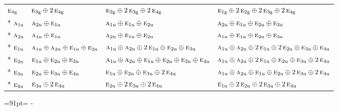 \documentclass[10pt,a4paper]{article}
\newcommand{\needspace}[1]{\par\penalty-100\begingroup\dimen0=#1\relax\dimen2=\pagegoal
  \advance\dimen2-\pagetotal\ifdim\dimen0>\dimen2\relax\ifdim\dimen2>0pt\vfil\break\fi\fi
  \endgroup}
\numberwithin{equation}{section}
\newcommand{\irr}[1]{\text{\normalfont\scshape #1}}
\newcommand{\ptag}[1]{\mathrm{#1}}
\begin{document}
{\begin{longtable}{@{}llll@{}}
$\irr{e}_{4\ptag{g}}$ & $\irr{e}_{3\ptag{g}}\oplus 2\,\irr{e}_{4\ptag{g}}$ & $\irr{e}_{2\ptag{g}}\oplus 2\,\irr{e}_{3\ptag{g}}\oplus 2\,\irr{e}_{4\ptag{g}}$ & $\irr{e}_{1\ptag{g}}\oplus 2\,\irr{e}_{2\ptag{g}}\oplus 2\,\irr{e}_{3\ptag{g}}\oplus 2\,\irr{e}_{4\ptag{g}}$\\*
$\irr{a}_{1\ptag{u}}$ & $\irr{a}_{2\ptag{u}}\oplus \irr{e}_{1\ptag{u}}$ & $\irr{a}_{1\ptag{u}}\oplus \irr{e}_{1\ptag{u}}\oplus \irr{e}_{2\ptag{u}}$ & $\irr{a}_{2\ptag{u}}\oplus \irr{e}_{1\ptag{u}}\oplus \irr{e}_{2\ptag{u}}\oplus \irr{e}_{3\ptag{u}}$\\*
$\irr{a}_{2\ptag{u}}$ & $\irr{a}_{1\ptag{u}}\oplus \irr{e}_{1\ptag{u}}$ & $\irr{a}_{2\ptag{u}}\oplus \irr{e}_{1\ptag{u}}\oplus \irr{e}_{2\ptag{u}}$ & $\irr{a}_{1\ptag{u}}\oplus \irr{e}_{1\ptag{u}}\oplus \irr{e}_{2\ptag{u}}\oplus \irr{e}_{3\ptag{u}}$\\*
$\irr{e}_{1\ptag{u}}$ & $\irr{a}_{1\ptag{u}}\oplus \irr{a}_{2\ptag{u}}\oplus \irr{e}_{1\ptag{u}}\oplus \irr{e}_{2\ptag{u}}$ & $\irr{a}_{1\ptag{u}}\oplus \irr{a}_{2\ptag{u}}\oplus 2\,\irr{e}_{1\ptag{u}}\oplus \irr{e}_{2\ptag{u}}\oplus \irr{e}_{3\ptag{u}}$ & $\irr{a}_{1\ptag{u}}\oplus \irr{a}_{2\ptag{u}}\oplus 2\,\irr{e}_{1\ptag{u}}\oplus 2\,\irr{e}_{2\ptag{u}}\oplus \irr{e}_{3\ptag{u}}\oplus \irr{e}_{4\ptag{u}}$\\*
$\irr{e}_{2\ptag{u}}$ & $\irr{e}_{1\ptag{u}}\oplus \irr{e}_{2\ptag{u}}\oplus \irr{e}_{3\ptag{u}}$ & $\irr{a}_{1\ptag{u}}\oplus \irr{a}_{2\ptag{u}}\oplus \irr{e}_{1\ptag{u}}\oplus \irr{e}_{2\ptag{u}}\oplus \irr{e}_{3\ptag{u}}\oplus \irr{e}_{4\ptag{u}}$ & $\irr{a}_{1\ptag{u}}\oplus \irr{a}_{2\ptag{u}}\oplus 2\,\irr{e}_{1\ptag{u}}\oplus \irr{e}_{2\ptag{u}}\oplus \irr{e}_{3\ptag{u}}\oplus 2\,\irr{e}_{4\ptag{u}}$\\*
$\irr{e}_{3\ptag{u}}$ & $\irr{e}_{2\ptag{u}}\oplus \irr{e}_{3\ptag{u}}\oplus \irr{e}_{4\ptag{u}}$ & $\irr{e}_{1\ptag{u}}\oplus \irr{e}_{2\ptag{u}}\oplus \irr{e}_{3\ptag{u}}\oplus 2\,\irr{e}_{4\ptag{u}}$ & $\irr{a}_{1\ptag{u}}\oplus \irr{a}_{2\ptag{u}}\oplus \irr{e}_{1\ptag{u}}\oplus \irr{e}_{2\ptag{u}}\oplus 2\,\irr{e}_{3\ptag{u}}\oplus 2\,\irr{e}_{4\ptag{u}}$\\*
$\irr{e}_{4\ptag{u}}$ & $\irr{e}_{3\ptag{u}}\oplus 2\,\irr{e}_{4\ptag{u}}$ & $\irr{e}_{2\ptag{u}}\oplus 2\,\irr{e}_{3\ptag{u}}\oplus 2\,\irr{e}_{4\ptag{u}}$ & $\irr{e}_{1\ptag{u}}\oplus 2\,\irr{e}_{2\ptag{u}}\oplus 2\,\irr{e}_{3\ptag{u}}\oplus 2\,\irr{e}_{4\ptag{u}}$\\
\bottomrule\end{longtable}}
\needspace{91pt}
\end{document}
